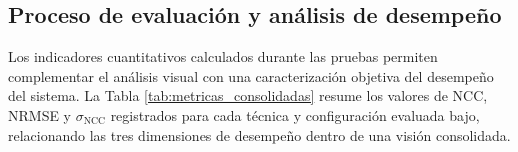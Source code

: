 \subsection{Proceso de evaluación y análisis de desempeño}

Los indicadores cuantitativos calculados durante las pruebas permiten complementar el análisis visual con una caracterización objetiva del desempeño del sistema. La Tabla \ref{tab:metricas_consolidadas} resume los valores de NCC, NRMSE y $\sigma_{\text{NCC}}$ registrados para cada técnica y configuración evaluada bajo, relacionando las tres dimensiones de desempeño dentro de una visión consolidada.

\begin{table}[H]
\centering
\caption{Resumen consolidado de métricas de desempeño por técnica y configuración.}
\label{tab:metricas_consolidadas}
\end{table}

